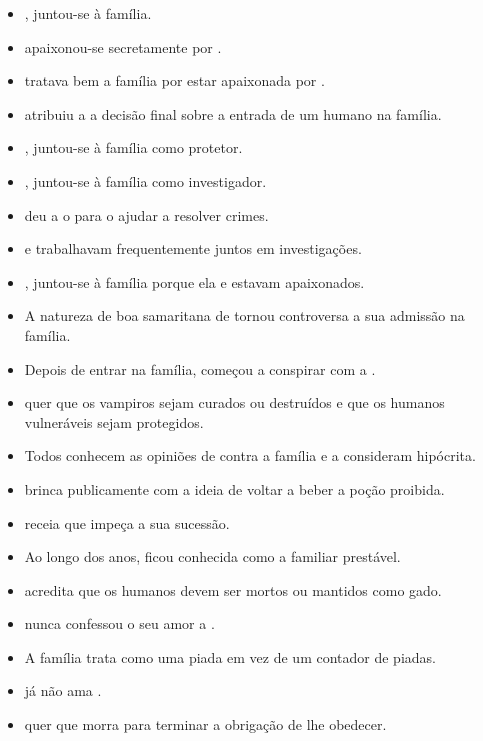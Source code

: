 \begin{itemize}
  \item {},  juntou-se à família.
  \item {} apaixonou-se secretamente por .
  \item {} tratava bem a família por estar apaixonada por .
  \item {} atribuiu a  a decisão final sobre a entrada de um humano na família.
  \item {},  juntou-se à família como protetor.
  \item {},  juntou-se à família como investigador.
  \item {} deu a  o  para o ajudar a resolver crimes.
  \item {} e  trabalhavam frequentemente juntos em investigações.
  \item {},  juntou-se à família porque ela e  estavam apaixonados.
  \item A natureza de boa samaritana de  tornou controversa a sua admissão na família.
  \item Depois de entrar na família,  começou a conspirar com a .
  \item {} quer que os vampiros sejam curados ou destruídos e que os humanos vulneráveis sejam protegidos.
  \item Todos conhecem as opiniões de  contra a família e a consideram hipócrita.
  \item {} brinca publicamente com a ideia de  voltar a beber a poção proibida.
  \item {} receia que  impeça a sua sucessão.
  \item Ao longo dos anos,  ficou conhecida como a familiar prestável.
  \item {} acredita que os humanos devem ser mortos ou mantidos como gado.
  \item {} nunca confessou o seu amor a .
  \item A família trata  como uma piada em vez de um contador de piadas.
  \item {} já não ama .
  \item {} quer que  morra para terminar a obrigação de lhe obedecer.


\end{itemize}
